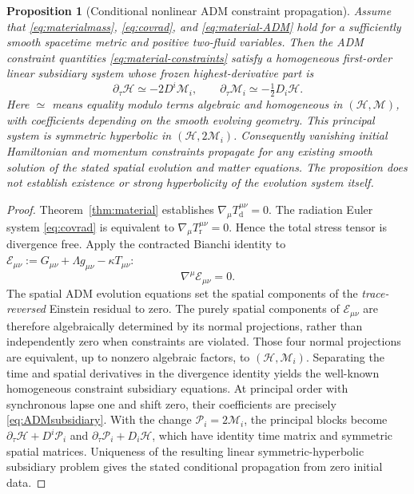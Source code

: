 \documentclass[11pt,a4paper]{article}
\newtheorem{proposition}{Proposition}
\begin{document}
\begin{proposition}[Conditional nonlinear ADM constraint propagation]
\label{prop:mat-constraint}
Assume that
\eqref{eq:materialmass}, \eqref{eq:covrad},
and \eqref{eq:material-ADM} hold for a
sufficiently smooth spacetime metric
and positive two-fluid variables.
Then the ADM constraint quantities
\eqref{eq:material-constraints} satisfy a
\emph{homogeneous} first-order linear
subsidiary system whose frozen
highest-derivative part is
\begin{equation}\label{eq:ADMsubsidiary}
\partial_\tau\mathcal H
\simeq-2D^i\mathcal M_i,\qquad
\partial_\tau\mathcal M_i
\simeq-\tfrac12D_i\mathcal H.
\end{equation}
Here $\simeq$ means equality modulo
terms algebraic and homogeneous in
$(\mathcal H,\mathcal M)$, with
coefficients depending on the
smooth evolving geometry.
This principal system is symmetric
hyperbolic in
$(\mathcal H,2\mathcal M_i)$.
Consequently vanishing initial
Hamiltonian and momentum constraints
propagate \emph{for any existing
smooth solution} of the stated
spatial evolution and matter equations.
The proposition does not establish
existence or strong hyperbolicity
of the evolution system itself.
\end{proposition}
\begin{proof}
Theorem~\ref{thm:material} establishes
$\nabla_\mu T_{\mathrm d}^{\mu\nu}=0$.
The radiation Euler system
\eqref{eq:covrad} is equivalent to
$\nabla_\mu T_{\mathrm r}^{\mu\nu}=0$.
Hence the total stress tensor is
divergence free.
Apply the contracted Bianchi identity
to $\mathcal E_{\mu\nu}
:=G_{\mu\nu}+\Lambda g_{\mu\nu}
-\kappa T_{\mu\nu}$:
\[
\nabla^\mu\mathcal E_{\mu\nu}=0.
\]
The spatial ADM evolution equations
set the spatial components of the
\emph{trace-reversed} Einstein residual
to zero. The purely spatial components
of $\mathcal E_{\mu\nu}$ are therefore
algebraically determined by its normal
projections, rather than independently
zero when constraints are violated.
Those four normal projections are
equivalent, up to nonzero algebraic
factors, to $(\mathcal H,\mathcal M_i)$.
Separating the time and spatial
derivatives in the divergence identity
yields the well-known homogeneous
constraint subsidiary equations.
At principal order with synchronous
lapse one and shift zero, their
coefficients are precisely
\eqref{eq:ADMsubsidiary}.
With the change $\mathcal P_i=2\mathcal M_i$,
the principal blocks become
$\partial_\tau\mathcal H+D^i\mathcal P_i$
and
$\partial_\tau\mathcal P_i+D_i\mathcal H$,
which have identity time matrix
and symmetric spatial matrices.
Uniqueness of the resulting linear
symmetric-hyperbolic subsidiary
problem gives the stated conditional
propagation from zero initial data.
\end{proof}
\end{document}
